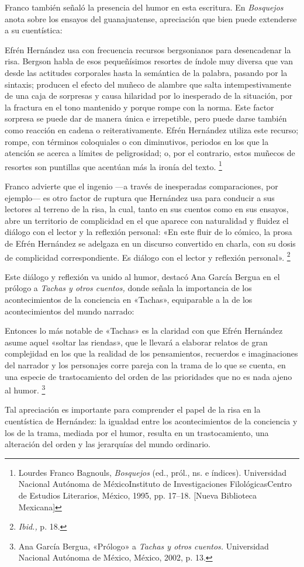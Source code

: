 \documentclass[14pt,twoside,final]{extbook} %
\let\oldfootnote\footnote
\renewcommand\footnote[1]{%
\oldfootnote{\hspace{1mm}#1}}
\begin{document}
Franco también señaló la presencia del humor en esta escritura. En \emph{Bosquejos} anota sobre los ensayos del guanajuatense, apreciación que bien puede extenderse a su cuentística:
\begin{quoting}
Efrén Hernández usa con frecuencia recursos bergsonianos para desencadenar la risa. Bergson habla de esos pequeñísimos resortes de índole muy diversa que van desde las actitudes corporales hasta la semántica de la palabra, pasando por la sintaxis; producen el efecto del muñeco de alambre que salta intempestivamente de una caja de sorpresas y causa hilaridad por lo inesperado de la situación, por la fractura en el tono mantenido y porque rompe con la norma. Este factor sorpresa se puede dar de manera única e irrepetible, pero puede darse también como reacción en cadena o reiterativamente. Efrén Hernández utiliza este recurso; rompe, con términos coloquiales o con diminutivos, periodos en los que la atención se acerca a límites de peligrosidad; o, por el contrario, estos muñecos de resortes son puntillas que acentúan más la ironía del texto.\footnote{Lourdes Franco Bagnouls, \emph{Bosquejos} (ed., pról., ns. e índices). Universidad Nacional Autónoma de México\kernedslash Instituto de Investigaciones Filológicas\kernedslash Centro de Estudios Literarios, México, 1995, pp. 17--18. [Nueva Biblioteca Mexicana]}
\end{quoting}
Franco advierte que el ingenio ---a través de inesperadas comparaciones, por ejemplo--- es otro factor de ruptura que Hernández usa para conducir a sus lectores al terreno de la risa, la cual, tanto en sus cuentos como en sus ensayos, abre un territorio de complicidad en el que aparece con naturalidad y fluidez el diálogo con el lector y la reflexión personal: «En este fluir de lo cómico, la prosa de Efrén Hernández se adelgaza en un discurso convertido en charla, con su dosis de complicidad correspondiente. Es diálogo con el lector y reflexión personal».\footnote{\emph{Ibid.,} p. 18.}

Este diálogo y reflexión va unido al humor, destacó Ana García Bergua en el prólogo a \emph{Tachas y otros cuentos,} donde señala la importancia de los acontecimientos de la conciencia en «Tachas», equiparable a la de los acontecimientos del mundo narrado:
\begin{quoting}
Entonces lo más notable de «Tachas» es la claridad con que Efrén Hernández asume aquel «soltar las riendas», que le llevará a elaborar relatos de gran complejidad en los que la realidad de los pensamientos, recuerdos e imaginaciones del narrador y los personajes corre pareja con la trama de lo que se cuenta, en una especie de trastocamiento del orden de las prioridades que no es nada ajeno al humor.\footnote{Ana García Bergua, «Prólogo» a \emph{Tachas y otros cuentos.} Universidad Nacional
Autónoma de México, México, 2002, p. 13.}
\end{quoting}
Tal apreciación es importante para comprender el papel de la risa en la cuentística de Hernández: la igualdad entre los acontecimientos de la conciencia y los de la trama, mediada por el humor, resulta en un trastocamiento, una alteración del orden y las jerarquías del mundo ordinario.
\end{document}
